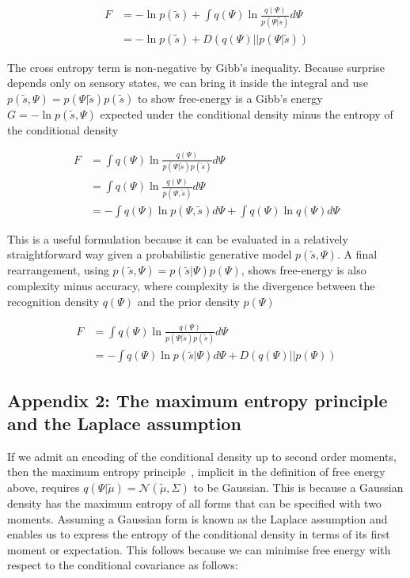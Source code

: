 \documentclass[a4paper]{article} %
\begin{document}
\begin{align}
F &= - \ln p(\tilde{s}) + \int  q(\Psi) \ln \frac{ q(\Psi)}{ p(\Psi | \tilde{s})} d \Psi \nonumber \\%
 &= - \ln p(\tilde{s}) + D( q(\Psi) || p(\Psi | \tilde{s}) )   \label{eq:app1-2}
\end{align}%

The cross entropy term is non-negative by Gibb's inequality. Because surprise depends only on sensory states, we can bring it inside the integral and use $p(\tilde{s} , \Psi) = p(\Psi | \tilde{s}) p(\tilde{s})$ to show free-energy is a Gibb's energy $G=- \ln p(\tilde{s} , \Psi)$ expected under the conditional density minus the entropy of the conditional density

\begin{align}
F &= \int  q(\Psi) \ln \frac{ q(\Psi)}{  p(\Psi | \tilde{s}) p(\tilde{s})} d \Psi \nonumber \\%
 &= \int  q(\Psi) \ln \frac{ q(\Psi)}{  p(\Psi, \tilde{s})} d \Psi  \label{eq:app1-3} \\%
 &= -\int  q(\Psi) \ln p(\Psi, \tilde{s}) d \Psi + \int q(\Psi) \ln  q(\Psi) d \Psi \nonumber %
\end{align}%

This is a useful formulation because it can be evaluated in a relatively straightforward way given a probabilistic generative model $p(\tilde{s} , \Psi)$. A final rearrangement, using $p(\tilde{s} , \Psi) = p(\tilde{s} | \Psi) p(\Psi)$, shows free-energy is also complexity minus accuracy, where complexity is the divergence between the recognition density $q(\Psi)$ and the prior density $p(\Psi)$

\begin{align}
F &= \int  q(\Psi) \ln \frac{ q(\Psi)}{  p(\Psi | \tilde{s}) p(\tilde{s})} d \Psi \nonumber \\%
 &= -\int  q(\Psi) \ln p(\tilde{s} | \Psi) d \Psi + D( q(\Psi) || p(\Psi) ) \label{eq:app1-4} %
\end{align}%

\subsection{Appendix 2: The maximum entropy principle and the Laplace assumption}

If we admit an encoding of the conditional density up to second order moments, then the maximum entropy principle~\citep{Jaynes57}, implicit in the definition of free energy above, requires $q(\Psi | \tilde{\mu}) = \mathcal{N}(\tilde{\mu}, \Sigma)$ to be Gaussian. This is because a Gaussian density has the maximum entropy of all forms that can be specified with two moments. Assuming a Gaussian form is known as the Laplace assumption and enables us to express the entropy of the conditional density in terms of its first moment or expectation. This follows because we can minimise free energy with respect to the conditional covariance as follows:
\end{document}
